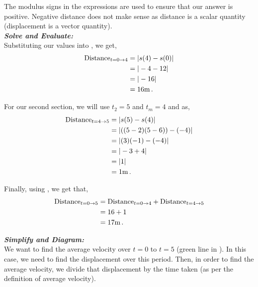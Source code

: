 \begin{subquestions}
\begin{subsubquestions}
\begin{subsubsubquestions}
The modulus signs in the expressions are used to ensure that our answer is positive. Negative distance does not make sense as distance is a scalar quantity (displacement is a vector quantity). \\


\textbf{\textit{Solve and Evaluate:}} \\
Substituting our values into , we get,
\begin{align}
	\text{Distance}_{t=0 \rightarrow 4} & = |s(4)-s(0)| \nonumber \\
							& = |-4-12| \nonumber \\
	                        & = |-16| \nonumber \\
	                        & = 16 \text{m} \,.
\end{align}

For our second section, we will use $t_2=5$ and $t_m=4$ and  as,
\begin{align}
	\text{Distance}_{t=4 \rightarrow 5} & = |s(5)-s(4)| \nonumber \\
	& = |((5-2)(5-6)) -(-4)| \nonumber \\
	& = |(3)(-1)-(-4)| \nonumber \\
	& = |-3+4| \nonumber \\
	& = |1| \nonumber \\
	& = 1 \text{m} \,.
\end{align}

Finally, using , we get that,
\begin{align}
	\text{Distance}_{t=0 \rightarrow 5} & = \text{Distance}_{t=0 \rightarrow 4} + \text{Distance}_{t=4 \rightarrow 5} \nonumber \\
	                        & = 16 + 1 \nonumber \\
	                        & = 17 \text{m} \,.
\end{align}


\subsubsubquestion

\textbf{\textit{Simplify and Diagram:}} \\
We want to find the average velocity over $t=0$ to $t=5$ (green line in ). In this case, we need to find the displacement over this period. Then, in order to find the average velocity, we divide that displacement by the time taken (as per the definition of average velocity). \\


\end{subsubsubquestions}
\end{subsubquestions}
\end{subquestions}
